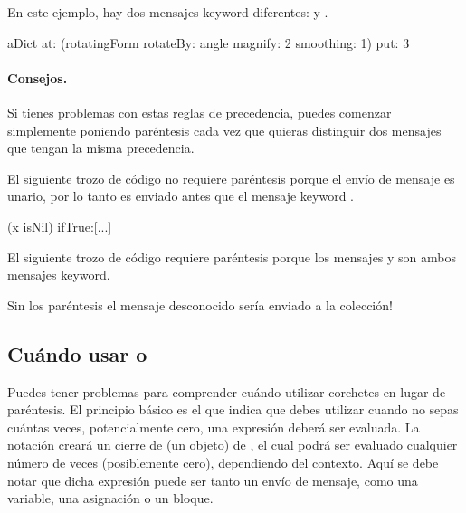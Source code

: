 \documentclass[a4paper,10pt,twoside]{book}
\begin{document}
En este ejemplo, hay dos mensajes keyword diferentes:  y .

\begin{code}{}
aDict
   at: (rotatingForm
          rotateBy: angle	
          magnify: 2
          smoothing: 1)
   put: 3
\end{code}



\paragraph{Consejos.} Si tienes problemas con estas reglas de precedencia, puedes comenzar simplemente poniendo paréntesis cada vez que quieras distinguir dos mensajes que tengan la misma precedencia.

El siguiente trozo de código no requiere paréntesis porque el envío de mensaje  es unario, por lo tanto es enviado antes que el mensaje keyword .
\begin{code}{}
(x isNil)
   ifTrue:[...]
\end{code}

El siguiente trozo de código requiere paréntesis porque los mensajes  y  son ambos mensajes keyword.
\noindent
Sin los paréntesis el mensaje desconocido  sería enviado a la colección!

\subsection{Cuándo usar \lct{[ ]} o \lct{( )}}
Puedes tener problemas para comprender cuándo utilizar corchetes en lugar de paréntesis.
El principio básico es el que indica que debes utilizar \ct{[ ]} cuando no sepas cuántas veces, potencialmente cero, una expresión deberá ser evaluada.
La notación  creará un cierre de  (\ie un objeto) de , el cual podrá ser evaluado cualquier número de veces (posiblemente cero), dependiendo del contexto. Aquí se debe notar que dicha expresión puede ser tanto un envío de mensaje, como una variable, una asignación o un bloque.
\end{document}
